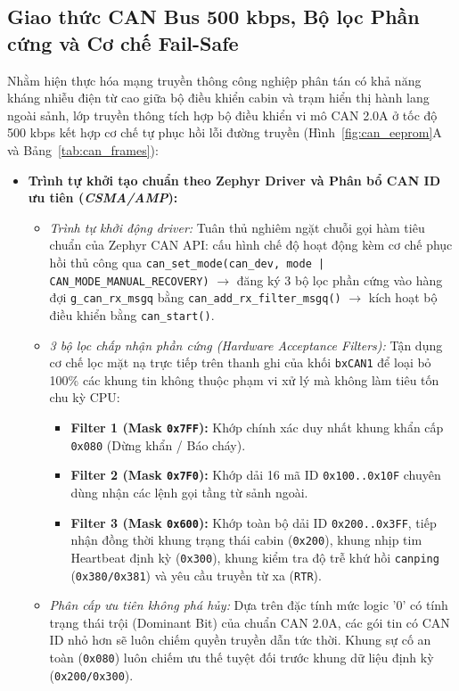 \subsection{Giao thức CAN Bus 500 kbps, Bộ lọc Phần cứng và Cơ chế Fail-Safe}
Nhằm hiện thực hóa mạng truyền thông công nghiệp phân tán có khả năng kháng nhiễu điện từ cao giữa bộ điều khiển cabin và trạm hiển thị hành lang ngoài sảnh, lớp truyền thông tích hợp bộ điều khiển vi mô CAN 2.0A ở tốc độ 500 kbps kết hợp cơ chế tự phục hồi lỗi đường truyền (Hình~\ref{fig:can_eeprom}A và Bảng~\ref{tab:can_frames}):
\begin{itemize}[nosep]
    \item \textbf{Trình tự khởi tạo chuẩn theo Zephyr Driver và Phân bổ CAN ID ưu tiên (\textit{CSMA/AMP}):}
    \begin{itemize}[nosep]
        \item \textit{Trình tự khởi động driver:} Tuân thủ nghiêm ngặt chuỗi gọi hàm tiêu chuẩn của Zephyr CAN API: cấu hình chế độ hoạt động kèm cơ chế phục hồi thủ công qua \texttt{can\_set\_mode(can\_dev, mode | CAN\_MODE\_MANUAL\_RECOVERY)} $\rightarrow$ đăng ký 3 bộ lọc phần cứng vào hàng đợi \texttt{g\_can\_rx\_msgq} bằng \texttt{can\_add\_rx\_filter\_msgq()} $\rightarrow$ kích hoạt bộ điều khiển bằng \texttt{can\_start()}.
        \item \textit{3 bộ lọc chấp nhận phần cứng (Hardware Acceptance Filters):} Tận dụng cơ chế lọc mặt nạ trực tiếp trên thanh ghi của khối \texttt{bxCAN1} để loại bỏ 100\% các khung tin không thuộc phạm vi xử lý mà không làm tiêu tốn chu kỳ CPU:
        \begin{itemize}[nosep]
            \item \textbf{Filter 1 (Mask \texttt{0x7FF}):} Khớp chính xác duy nhất khung khẩn cấp \texttt{0x080} (Dừng khẩn / Báo cháy).
            \item \textbf{Filter 2 (Mask \texttt{0x7F0}):} Khớp dải 16 mã ID \texttt{0x100..0x10F} chuyên dùng nhận các lệnh gọi tầng từ sảnh ngoài.
            \item \textbf{Filter 3 (Mask \texttt{0x600}):} Khớp toàn bộ dải ID \texttt{0x200..0x3FF}, tiếp nhận đồng thời khung trạng thái cabin (\texttt{0x200}), khung nhịp tim Heartbeat định kỳ (\texttt{0x300}), khung kiểm tra độ trễ khứ hồi \texttt{canping} (\texttt{0x380/0x381}) và yêu cầu truyền từ xa (\texttt{RTR}).
        \end{itemize}
        \item \textit{Phân cấp ưu tiên không phá hủy:} Dựa trên đặc tính mức logic '0' có tính trạng thái trội (Dominant Bit) của chuẩn CAN 2.0A, các gói tin có CAN ID nhỏ hơn sẽ luôn chiếm quyền truyền dẫn tức thời. Khung sự cố an toàn (\texttt{0x080}) luôn chiếm ưu thế tuyệt đối trước khung dữ liệu định kỳ (\texttt{0x200/0x300}).

\end{itemize}
\end{itemize}

